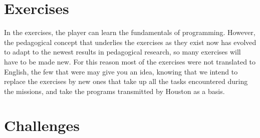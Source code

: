 \chapter{Exercises}

In the exercises, the player can learn the fundamentals of programming. However, the pedagogical concept that underlies the exercises as they exist now has evolved to adapt to the newest results in pedagogical research, so many exercises will have to be made new. For this reason most of the exercises were not translated to English, the few that were may give you an idea, knowing that we intend to replace the exercises by new ones that take up all the tasks encountered during the missions, and take the programs transmitted by Houston as a basis.


\chapter{Challenges}


